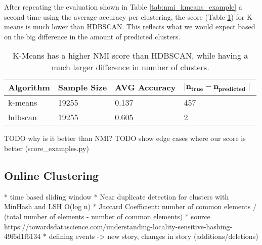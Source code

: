 After repeating the evaluation shown in Table \ref{tab:nmi_kmeans_example} a second time using the average accuracy per clustering, the score (Table \ref{tab:avg_predict_kmeans_example}) for K-means is much lower than HDBSCAN. This reflects what we would expect based on the big difference in the amount of predicted clusters.

\begin{table}[h]
    \centering
    \begin{tabular}{|l|l|l|l|}
    \hline
    \textbf{Algorithm} & \textbf{Sample Size} & \textbf{AVG Accuracy}  & $\mathbf{ \mid n_{true} - n_{predicted} \mid }$ \\ \hline
    k-means & 19255 & 0.137 & 457 \\ \hline
    hdbscan & 19255 & 0.605 & 2 \\ \hline
    \end{tabular}
    \caption{K-Means has a higher NMI score than HDBSCAN, while having a much larger difference in number of clusters.}
    \label{tab:avg_predict_kmeans_example}
\end{table}

TODO why is it better than NMI?
TODO show edge cases where our score is better (score\_examples.py)

\subsection{Online Clustering}

* time based sliding window
* Near duplicate detection for clusters with MinHash and LSH O(log n)
* Jaccard Coefficient: number of common elements / (total number of elements - number of common elements)
* source https://towardsdatascience.com/understanding-locality-sensitive-hashing-49f6d1f6134
* defining events -> new story, changes in story (additions/deletions)
